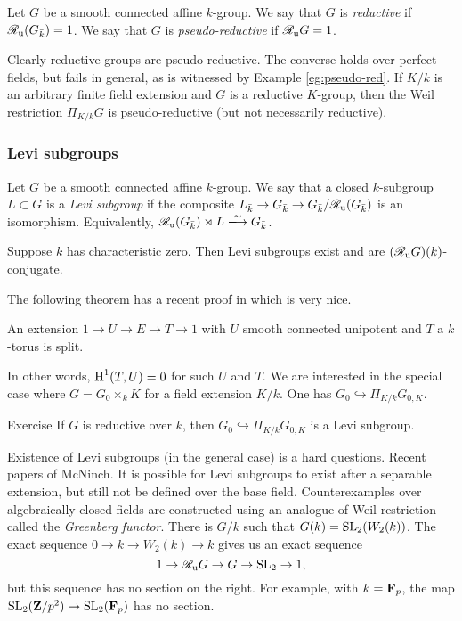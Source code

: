 Let $G$ be a smooth connected affine $k$-group. We say that $G$ is 
\emph{reductive} if $\mathscr{R}_{\mathrm{u}} (G_{\bar k})=1$. We say that $G$ is 
\emph{pseudo-reductive} if $\mathscr{R}_{\mathrm{u}}  G=1$. 

Clearly reductive groups are pseudo-reductive. The converse holds over 
perfect fields, but fails in general, as is witnessed by 
Example \ref{eg:pseudo-red}. If $K/k$ is an arbitrary finite field 
extension and $G$ is a reductive $K$-group, then the Weil restriction 
$\Pi_{K/k} G$ is pseudo-reductive (but not necessarily reductive). 


\subsubsection{Levi subgroups}

Let $G$ be a smooth connected affine $k$-group. We say that a closed 
$k$-subgroup $L\subset G$ is a \emph{Levi subgroup} if the composite 
$L_{\bar k} \to G_{\bar k} \to G_{\bar k}/\mathscr{R}_{\mathrm{u}} (G_{\bar k})$ is an 
isomorphism. Equivalently, 
$\sR_\unipotent (G_{\bar k})\rtimes L\isomorphism G_{\bar k}$. 

\begin{theo}[Mostow]
Suppose $k$ has characteristic zero. Then Levi subgroups exist and are 
$(\mathscr{R}_{\mathrm{u}} G)(k)$-conjugate. 
\end{theo}

The following theorem has a recent proof in \cite{demarche} which is very nice. 

\begin{theo}[SGA 3]
An extension $1 \to U \to E\to T\to 1$ with $U$ smooth connected unipotent and 
$T$ a $k$-torus is split. 
\end{theo}

In other words, $\operatorname{H}^1(T,U)=0$ for such $U$ and $T$. We are interested in the 
special case where $G=G_0\times_k K$ for a field extension $K/k$. 
One has $G_0\hookrightarrow \Pi_{K/k} G_{0,K}$. 

\begin{enonce}[remark]{Exercise}
If $G$ is reductive over $k$, then $G_0\hookrightarrow \Pi_{K/k} G_{0,K}$ is a 
Levi subgroup. 
\end{enonce}


Existence of Levi subgroups (in the general case) is a hard questions. Recent 
papers of McNinch. It is possible for Levi subgroups to exist after a 
separable extension, but still not be defined over the base field. Counterexamples 
over algebraically closed fields are constructed using an analogue of Weil 
restriction called the \emph{Greenberg functor}. There is $G/k$ such that 
$G(k)=\operatorname{SL}_2(W_2(k))$. The exact sequence 
$0 \to k \to W_2(k) \to k$ gives us an exact sequence 
\[
  1 \to \mathscr{R}_{\mathrm{u}}  G \to G \to \operatorname{SL}_2 \to 1 ,
\]
but this sequence has no section on the right. For example, with 
$k=\mathbf{F}_p$, the map $\operatorname{SL}_2(\mathbf{Z}/p^2) \to \operatorname{SL}_2(\mathbf{F}_p)$ has 
no section. 

